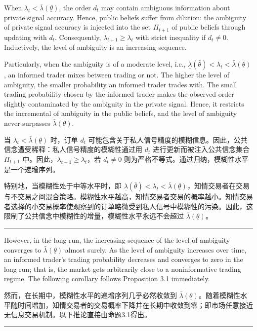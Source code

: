 \documentclass[12pt,a4paper]{article}
\newenvironment{original}{%
  \par\vspace{4pt}\noindent%
  \color{black}%
  \ignorespaces
}{%
  \par\vspace{2pt}%
}
\newenvironment{translation}{%
  \par\vspace{2pt}\noindent%
  \color{transblue}%
  \ignorespaces
}{%
  \par\vspace{4pt}\hrule\vspace{6pt}%
}
\begin{document}
\begin{original}
When $\lambda_t < \bar{\lambda}(\underline{\theta})$, the order $d_t$ may contain ambiguous information about private signal accuracy. Hence, public beliefs suffer from dilution: the ambiguity of private signal accuracy is injected into the set $\Pi_{t+1}$ of public beliefs through updating with $d_t$. Consequently, $\lambda_{t+1} \geq \lambda_t$ with strict inequality if $d_t \neq 0$. Inductively, the level of ambiguity is an increasing sequence.

Particularly, when the ambiguity is of a moderate level, i.e., $\underline{\lambda}(\bar{\theta}) < \lambda_t < \bar{\lambda}(\underline{\theta})$, an informed trader mixes between trading or not. The higher the level of ambiguity, the smaller probability an informed trader trades with. The small trading probability chosen by the informed trader makes the observed order slightly contaminated by the ambiguity in the private signal. Hence, it restricts the incremental of ambiguity in the public beliefs, and the level of ambiguity never surpasses $\bar{\lambda}(\underline{\theta})$.
\end{original}
\begin{translation}
当 $\lambda_t < \bar{\lambda}(\underline{\theta})$ 时，订单 $d_t$ 可能包含关于私人信号精度的模糊信息。因此，公共信念遭受稀释：私人信号精度的模糊性通过用 $d_t$ 进行更新而被注入公共信念集合 $\Pi_{t+1}$ 中。因此，$\lambda_{t+1} \geq \lambda_t$，若 $d_t \neq 0$ 则为严格不等式。通过归纳，模糊性水平是一个递增序列。

特别地，当模糊性处于中等水平时，即 $\underline{\lambda}(\bar{\theta}) < \lambda_t < \bar{\lambda}(\underline{\theta})$，知情交易者在交易与不交易之间混合策略。模糊性水平越高，知情交易者交易的概率越小。知情交易者选择的小交易概率使观察到的订单略微受到私人信号中模糊性的污染。因此，这限制了公共信念中模糊性的增量，模糊性水平永远不会超过 $\bar{\lambda}(\underline{\theta})$。
\end{translation}

\begin{original}
However, in the long run, the increasing sequence of the level of ambiguity converges to $\bar{\lambda}(\underline{\theta})$ almost surely. As the level of ambiguity increases over time, an informed trader's trading probability decreases and converges to zero in the long run; that is, the market gets arbitrarily close to a noninformative trading regime. The following corollary follows Proposition 3.1 immediately.
\end{original}
\begin{translation}
然而，在长期中，模糊性水平的递增序列几乎必然收敛到 $\bar{\lambda}(\underline{\theta})$。随着模糊性水平随时间增加，知情交易者的交易概率下降并在长期中收敛到零；即市场任意接近无信息交易机制。以下推论直接由命题3.1得出。
\end{translation}
\end{document}
